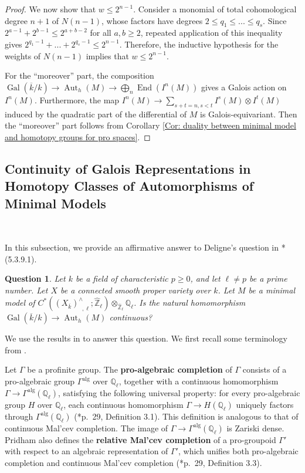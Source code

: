 \documentclass[11pt]{amsart}
\newtheorem{question}[theorem]{Question}
\theoremstyle{definition}
\numberwithin{equation}{section}
\numberwithin{equation}{section}
\newcommand\QQ{\mathbb{Q}}
\newcommand\ZZ{\mathbb{Z}}
\DeclareMathOperator{\Aut}{Aut}
\DeclareMathOperator{\et}{\acute{e}t}
\DeclareMathOperator{\Gal}{Gal}
\DeclareMathOperator{\End}{End}
\begin{document}
\begin{proof}
We now show that $w\leq 2^{n-1}$. Consider a monomial of total cohomological degree $n+1$ of $N(n-1)$, whose factors have degrees $2\leq q_1\leq ...\leq q_s$. Since $2^{a-1}+2^{b-1}\leq 2^{a+b-2}$ for all $a,b\geq 2$, repeated application of this inequality gives $2^{q_1-1}+...+2^{q_s-1}\leq 2^{n-1}$. Therefore, the inductive hypothesis for the weights of $N(n-1)$ implies that $w\leq 2^{n-1}$. 

For the ``moreover'' part, the composition $\Gal(\overline{k}/k)\rightarrow \Aut_h(M)\rightarrow \bigoplus_n \End(I^n(M))$ gives a Galois action on $I^n(M)$. Furthermore, the map $I^n(M)\rightarrow \sum_{s+t=n,s<t}I^s(M)\otimes I^t(M)$ induced by the quadratic part of the differential of $M$ is Galois-equivariant. Then the ``moreover'' part
follows from Corollary \ref{Cor: duality between minimal model and homotopy groups for pro spaces}.
\end{proof}

\subsection{Continuity of Galois Representations in Homotopy Classes of Automorphisms of Minimal Models}\,

In this subsection, we provide an affirmative answer to Deligne's question in \cite{Deligne-Weil-II}*{(5.3.9.1)}.

\begin{question}\label{Question: Deligne 1}
Let $k$ be a field of characteristic $p\geq 0$, and let $\ell\neq p$ be a prime number. Let $X$ be a connected smooth proper variety over $k$. Let $M$ be a minimal model of $C^*((X_{\overline{k}})^{\wedge}_{\et,\ell};\widehat{\ZZ}_{\ell})\otimes_{\widehat{\ZZ}_{\ell}}\QQ_{\ell}$.
Is the natural homomorphism $\Gal(\overline{k}/k)\rightarrow \Aut_h(M)$ continuous?
\end{question}

We use the results in \cite{Pridham-Galois-actions-on-homotopy-groups-algebraic-varieties} to answer this question. We first recall some terminology from \cite{Pridham-Galois-actions-on-homotopy-groups-algebraic-varieties}.

Let $\Gamma$ be a profinite group. The \textbf{pro-algebraic completion} of $\Gamma$ consists of a pro-algebraic group $\Gamma^{\mathrm{alg}}$ over $\QQ_{\ell}$, together with a continuous homomorphism $\Gamma\rightarrow \Gamma^{\mathrm{alg}}(\QQ_{\ell})$, satisfying the following universal property: for every pro-algebraic group $H$ over $\QQ_{\ell}$, each continuous homomorphism $\Gamma\rightarrow H(\QQ_{\ell})$ uniquely factors through $\Gamma^{\mathrm{alg}}(\QQ_{\ell})$ (\cite{Pridham-Galois-actions-on-homotopy-groups-algebraic-varieties}*{p.~29, Definition 3.1}). This definition is analogous to that of continuous Mal'cev completion. The image of $\Gamma\rightarrow \Gamma^{\mathrm{alg}}(\QQ_{\ell})$ is Zariski dense. Pridham also defines the \textbf{relative Mal'cev completion} of a pro-groupoid $\Gamma'$ with respect to an algebraic representation of $\Gamma'$, which unifies both pro-algebraic completion and continuous Mal'cev completion (\cite{Pridham-Galois-actions-on-homotopy-groups-algebraic-varieties}*{p.~29, Definition 3.3}).
\end{document}
